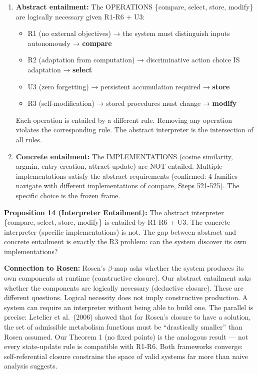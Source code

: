 \documentclass[
  11pt,
]{article}
\providecommand{\tightlist}{%
  \setlength{\itemsep}{0pt}\setlength{\parskip}{0pt}}
\begin{document}
\begin{enumerate}
\def\labelenumi{\arabic{enumi}.}
\item
  \textbf{Abstract entailment:} The OPERATIONS \{compare, select, store,
  modify\} are logically necessary given R1-R6 + U3:

  \begin{itemize}
  \tightlist
  \item
    R1 (no external objectives) → the system must distinguish inputs
    autonomously → \textbf{compare}
  \item
    R2 (adaptation from computation) → discriminative action choice IS
    adaptation → \textbf{select}
  \item
    U3 (zero forgetting) → persistent accumulation required →
    \textbf{store}
  \item
    R3 (self-modification) → stored procedures must change →
    \textbf{modify}
  \end{itemize}

  Each operation is entailed by a different rule. Removing any operation
  violates the corresponding rule. The abstract interpreter is the
  intersection of all rules.
\item
  \textbf{Concrete entailment:} The IMPLEMENTATIONS (cosine similarity,
  argmin, entry creation, attract-update) are NOT entailed. Multiple
  implementations satisfy the abstract requirements (confirmed: 4
  families navigate with different implementations of compare, Steps
  521-525). The specific choice is the frozen frame.
\end{enumerate}

\textbf{Proposition 14 (Interpreter Entailment):} The abstract
interpreter \{compare, select, store, modify\} is entailed by R1-R6 +
U3. The concrete interpreter (specific implementations) is not. The gap
between abstract and concrete entailment is exactly the R3 problem: can
the system discover its own implementations?

\textbf{Connection to Rosen:} Rosen's \(\beta\)-map asks whether the
system produces its own components at runtime (constructive closure).
Our abstract entailment asks whether the components are logically
necessary (deductive closure). These are different questions. Logical
necessity does not imply constructive production. A system can require
an interpreter without being able to build one. The parallel is precise:
Letelier et al.~(2006) showed that for Rosen's closure to have a
solution, the set of admissible metabolism functions must be
``drastically smaller'' than Rosen assumed. Our Theorem 1 (no fixed
points) is the analogous result --- not every state-update rule is
compatible with R1-R6. Both frameworks converge: self-referential
closure constrains the space of valid systems far more than naive
analysis suggests.
\end{document}
